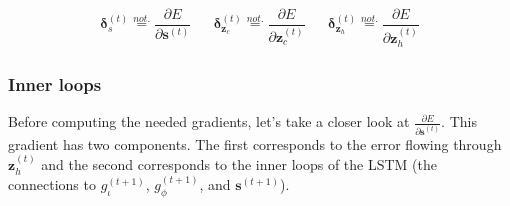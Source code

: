 \documentclass[11pt]{article}
\begin{document}
\begin{align}
     \boldsymbol{\delta}_{s}^{(t)} \overset{not.}{=}
     \dfrac{\partial E}{\partial \boldsymbol{s}^{(t)}}
  &&
     \boldsymbol{\delta}_{\mathbf{z}_c}^{(t)} \overset{not.}{=}
     \dfrac{\partial E}{\partial \boldsymbol{z}_c^{(t)}}
  &&
     \boldsymbol{\delta}_{\mathbf{z}_h}^{(t)} \overset{not.}{=}
     \dfrac{\partial E}{\partial \boldsymbol{z}_h^{(t)}}
\end{align}

\subsubsection*{Inner loops}

Before computing the needed gradients, let's take a closer look at
$\frac{\partial E}{\partial \mathbf{s}^{(t)}}$. This gradient has two
components. The first corresponds to the error flowing through
$\mathbf{z}_h^{(t)}$ and the second corresponds to the inner loops of
the LSTM (the connections to $g_{\iota}^{(t+1)}$, $g_{\phi}^{(t+1)}$,
and $\mathbf{s}^{(t+1)}$).
\end{document}
